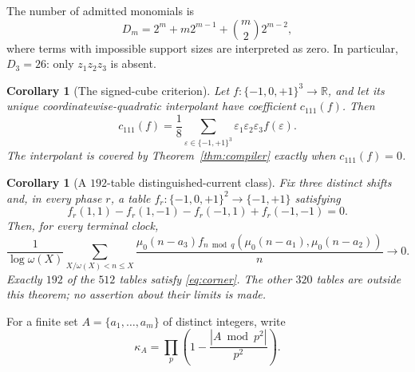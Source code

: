 \documentclass[11pt]{article}
\newtheorem{corollary}[theorem]{Corollary}
\theoremstyle{definition}
\theoremstyle{remark}
\newcommand{\mob}{\mu}
\newcommand{\kap}{\kappa}
\newcommand{\T}{\{-1,0,+1\}}
\begin{document}
The number of admitted monomials is
\begin{equation}
 D_m=2^m+m2^{m-1}+\binom m2 2^{m-2},
 \label{eq:dimension}
\end{equation}
where terms with impossible support sizes are interpreted as zero.  In
particular, \(D_3=26\): only \(z_1z_2z_3\) is absent.

\begin{corollary}[The signed-cube criterion]
\label{cor:c111}
Let \(f:\T^3\to\mathbb R\), and let its unique coordinatewise-quadratic
interpolant have coefficient \(c_{111}(f)\).  Then
\begin{equation}
 c_{111}(f)=\frac18\sum_{\varepsilon\in\{-1,+1\}^3}
 \varepsilon_1\varepsilon_2\varepsilon_3f(\varepsilon).
 \label{eq:c111}
\end{equation}
The interpolant is covered by Theorem~\ref{thm:compiler} exactly when
\(c_{111}(f)=0\).
\end{corollary}

\begin{corollary}[A \(192\)-table distinguished-current class]
\label{cor:192}
Fix three distinct shifts and, in every phase \(r\), a table
\(f_r:\T^2\to\{-1,+1\}\) satisfying
\begin{equation}
 f_r(1,1)-f_r(1,-1)-f_r(-1,1)+f_r(-1,-1)=0.
 \label{eq:corner}
\end{equation}
Then, for every terminal clock,
\begin{equation}
 \frac1{\log\omega(X)}\sum_{X/\omega(X)<n\le X}
 \frac{\mob_0(n-a_3)
 f_{n\bmod q}(\mob_0(n-a_1),\mob_0(n-a_2))}{n}
 \longrightarrow0.
 \label{eq:table-limit}
\end{equation}
Exactly \(192\) of the \(512\) tables satisfy \eqref{eq:corner}.  The other
\(320\) tables are outside this theorem; no assertion about their limits is
made.
\end{corollary}

For a finite set \(A=\{a_1,\ldots,a_m\}\) of distinct integers, write
\begin{equation}
 \kap_A=\prod_p\left(1-\frac{|A\bmod p^2|}{p^2}\right).
 \label{eq:global-kappa}
\end{equation}
\end{document}
